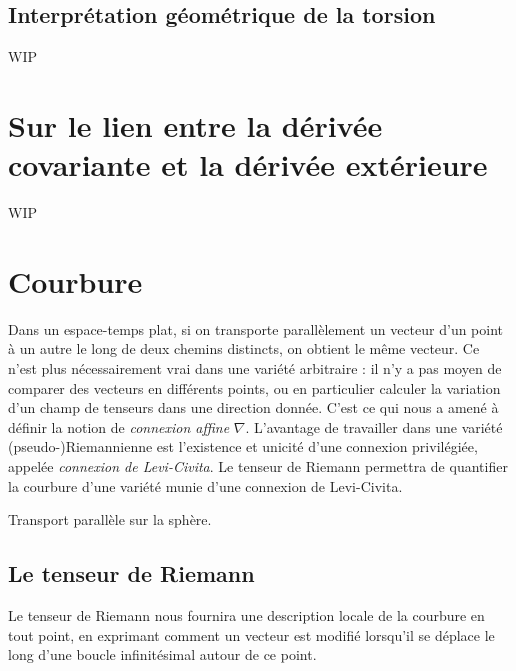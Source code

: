 \subsection{Interprétation géométrique de la torsion}
WIP
\section{Sur le lien entre la dérivée covariante et la dérivée extérieure}
WIP
\section{Courbure}
Dans un espace-temps plat, si on transporte parallèlement un vecteur d'un point à un autre le long de deux chemins distincts, on obtient le même vecteur. Ce n'est plus nécessairement vrai dans une variété arbitraire : il n'y a pas moyen de comparer des vecteurs en différents points, ou en particulier calculer la variation d'un champ de tenseurs dans une direction donnée. C'est ce qui nous a amené à définir la notion de \emph{connexion affine} $\nabla$. L'avantage de travailler dans une variété (pseudo-)Riemannienne est l'existence et unicité d'une connexion privilégiée, appelée \emph{connexion de Levi-Civita}. Le tenseur de Riemann permettra de quantifier la courbure d'une variété munie d'une connexion de Levi-Civita.
\begin{exmp}
    Transport parallèle sur la sphère.
\end{exmp}
\subsection{Le tenseur de Riemann}
Le tenseur de Riemann nous fournira une description locale de la courbure en tout point, en exprimant comment un vecteur est modifié lorsqu'il se déplace le long d'une boucle infinitésimal autour de ce point. 

